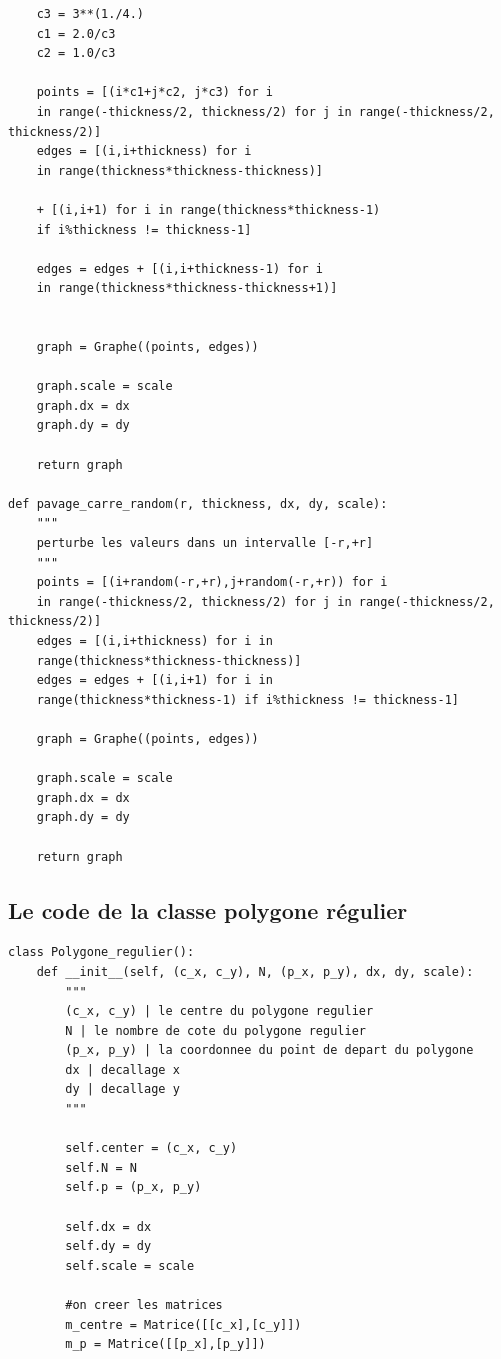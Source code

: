 \documentclass{book}
\begin{document}
\begin{appendices}
\begin{lstlisting}
    c3 = 3**(1./4.)
    c1 = 2.0/c3
    c2 = 1.0/c3
    
    points = [(i*c1+j*c2, j*c3) for i
    in range(-thickness/2, thickness/2) for j in range(-thickness/2, thickness/2)]
    edges = [(i,i+thickness) for i 
    in range(thickness*thickness-thickness)] 
    
    + [(i,i+1) for i in range(thickness*thickness-1)
    if i%thickness != thickness-1] 
    
    edges = edges + [(i,i+thickness-1) for i 
    in range(thickness*thickness-thickness+1)]
    
    
    graph = Graphe((points, edges))
    
    graph.scale = scale
    graph.dx = dx
    graph.dy = dy
    
    return graph

def pavage_carre_random(r, thickness, dx, dy, scale):
    """
    perturbe les valeurs dans un intervalle [-r,+r]
    """
    points = [(i+random(-r,+r),j+random(-r,+r)) for i 
    in range(-thickness/2, thickness/2) for j in range(-thickness/2, thickness/2)]
    edges = [(i,i+thickness) for i in 
    range(thickness*thickness-thickness)]
    edges = edges + [(i,i+1) for i in
    range(thickness*thickness-1) if i%thickness != thickness-1]
    
    graph = Graphe((points, edges))
    
    graph.scale = scale
    graph.dx = dx
    graph.dy = dy
    
    return graph
\end{lstlisting}

\subsection{Le code de la classe polygone régulier}
\begin{lstlisting}
class Polygone_regulier():
    def __init__(self, (c_x, c_y), N, (p_x, p_y), dx, dy, scale):
        """
        (c_x, c_y) | le centre du polygone regulier
        N | le nombre de cote du polygone regulier
        (p_x, p_y) | la coordonnee du point de depart du polygone
        dx | decallage x
        dy | decallage y
        """
        
        self.center = (c_x, c_y)
        self.N = N
        self.p = (p_x, p_y)
        
        self.dx = dx
        self.dy = dy
        self.scale = scale
        
        #on creer les matrices 
        m_centre = Matrice([[c_x],[c_y]])
        m_p = Matrice([[p_x],[p_y]])
        

\end{lstlisting}
\end{appendices}
\end{document}
